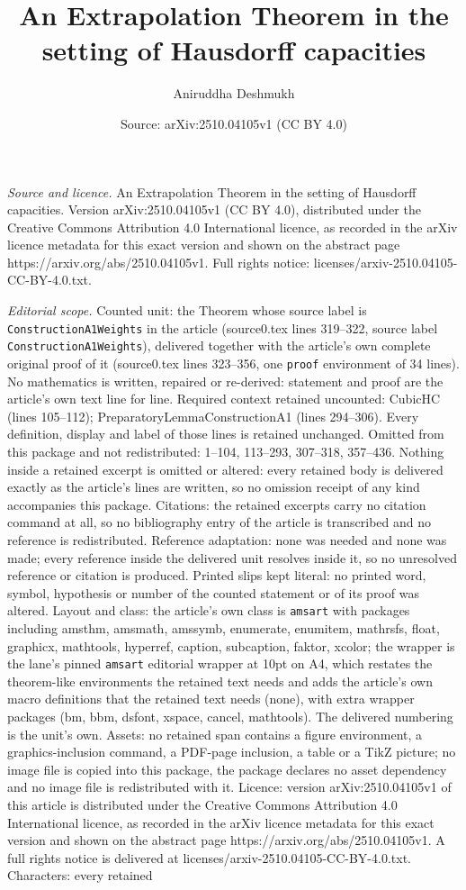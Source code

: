 \documentclass[10pt,a4paper]{amsart}
\title[An Extrapolation Theorem in the setting of Hausdorff capacit]{An Extrapolation Theorem in the setting of Hausdorff capacities}
\author{Aniruddha Deshmukh}
\date{Source: arXiv:2510.04105v1 (CC BY 4.0)}
\begin{document}
\maketitle

\noindent\emph{Source and licence.} An Extrapolation Theorem in the setting of Hausdorff capacities. Version arXiv:2510.04105v1 (CC BY 4.0), distributed under the Creative Commons Attribution 4.0 International licence, as recorded in the arXiv licence metadata for this exact version and shown on the abstract page https://arxiv.org/abs/2510.04105v1. Full rights notice: licenses/arxiv-2510.04105-CC-BY-4.0.txt.\par\smallskip

\noindent\textit{Editorial scope.} Counted unit: the Theorem whose source label is \texttt{ConstructionA1Weights} in the article (source0.tex lines 319--322, source label \texttt{ConstructionA1Weights}), delivered together with the article's own complete original proof of it (source0.tex lines 323--356, one \texttt{proof} environment of 34 lines). No mathematics is written, repaired or re-derived: statement and proof are the article's own text line for line. Required context retained uncounted: CubicHC (lines 105--112); PreparatoryLemmaConstructionA1 (lines 294--306). Every definition, display and label of those lines is retained unchanged. Omitted from this package and not redistributed: 1--104, 113--293, 307--318, 357--436. Nothing inside a retained excerpt is omitted or altered: every retained body is delivered exactly as the article's lines are written, so no omission receipt of any kind accompanies this package. Citations: the retained excerpts carry no citation command at all, so no bibliography entry of the article is transcribed and no reference is redistributed. Reference adaptation: none was needed and none was made; every reference inside the delivered unit resolves inside it, so no unresolved reference or citation is produced. Printed slips kept literal: no printed word, symbol, hypothesis or number of the counted statement or of its proof was altered. Layout and class: the article's own class is \texttt{amsart} with packages including amsthm, amsmath, amssymb, enumerate, enumitem, mathrsfs, float, graphicx, mathtools, hyperref, caption, subcaption, faktor, xcolor; the wrapper is the lane's pinned \texttt{amsart} editorial wrapper at 10pt on A4, which restates the theorem-like environments the retained text needs and adds the article's own macro definitions that the retained text needs (none), with extra wrapper packages (bm, bbm, dsfont, xspace, cancel, mathtools). The delivered numbering is the unit's own. Assets: no retained span contains a figure environment, a graphics-inclusion command, a PDF-page inclusion, a table or a TikZ picture; no image file is copied into this package, the package declares no asset dependency and no image file is redistributed with it. Licence: version arXiv:2510.04105v1 of this article is distributed under the Creative Commons Attribution 4.0 International licence, as recorded in the arXiv licence metadata for this exact version and shown on the abstract page https://arxiv.org/abs/2510.04105v1. A full rights notice is delivered at licenses/arxiv-2510.04105-CC-BY-4.0.txt. Characters: every retained 
\end{document}

